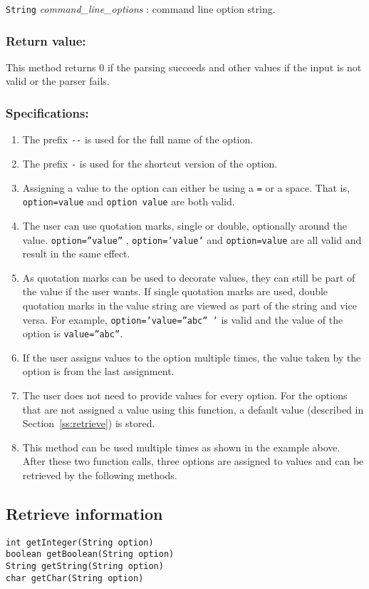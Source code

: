 \documentclass{article}
\begin{document}
\lstinline{String} \textsl{command\_line\_options} : command line option string.

\subsubsection*{Return value:}

This method returns 0 if the parsing succeeds and other values if the input is not valid or the
parser fails.

\subsubsection*{Specifications:}
\begin{enumerate}
\item The prefix \lstinline{--} is used for the full name of the option.
\item The prefix \lstinline{-} is used for the shortcut version of the option.
\item Assigning a value to the option can either be using a \lstinline{=}
  or a space. That is, \lstinline{option=value} and \lstinline{option value}
  are both valid.
\item The user can use quotation marks, single or double, optionally
  around the value.  \texttt{option=”value”} , \texttt{option=’value’}
  and \lstinline{option=value} are all valid and result in the same
  effect.
\item As quotation marks can be used to decorate values, they can
  still be part of the value if the user wants. If single quotation
  marks are used, double quotation marks in the value string are
  viewed as part of the string and vice versa. For example,
  \texttt{option=’value=”abc” ’} is valid and the value of the option is
  \texttt{value=”abc”}.
\item If the user assigns values to the option multiple times, the
  value taken by the option is from the last assignment.
\item The user does not need to provide values for every option. For
  the options that are not assigned a value using this function, a
  default value (described in Section~\ref{ss:retrieve}) is stored.
\item This method can be used multiple times as shown in the example
  above. After these two function calls, three options are assigned to
  values and can be retrieved by the following methods.
\end{enumerate}

\subsection{Retrieve information\label{ss:retrieve}}
\begin{lstlisting}
int getInteger(String option)
boolean getBoolean(String option)
String getString(String option)
char getChar(String option)
\end{lstlisting}
\end{document}
